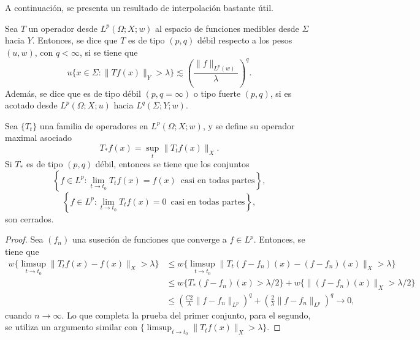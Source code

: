 A continuación, se presenta un resultado de interpolación bastante útil. 
\begin{definition}
	Sea $T$ un operador desde $L^p(\Omega;X;w)$ al espacio de funciones medibles desde $\Sigma$ hacia $Y$. Entonces, se dice que $T$ es de tipo $(p,q)$ débil respecto a los pesos $(u,w)$, con $q<\infty$, si se tiene que 
	\begin{equation*}
		u\{x\in\Sigma:\|Tf(x)\|_Y>\lambda\}\lesssim \left(\frac{\|f\|_{L^p(w)}}{\lambda}\right)^q.
	\end{equation*}
	Además, se dice que es de tipo débil $(p, q=\infty)$ o tipo fuerte $(p, q)$, si es acotado desde $L^p(\Omega;X;u)$ hacia $L^q(\Sigma;Y;w)$.
\end{definition}
\begin{theorem}\label{theo:weak-closed}
	Sea $\{T_t\}$ una familia de operadores en $L^p(\Omega;X;w)$, y se define su operador maximal asociado 
	\begin{equation*}
		T_*f(x) = \sup_t \|T_tf(x)\|_X.
	\end{equation*}
	Si $T_*$ es de tipo $(p,q)$ débil, entonces se tiene que los conjuntos
	\begin{equation*}
		\left\{f\in L^p: \lim_{t\to t_0} T_tf(x) = f(x)\, \text{ casi en todas partes} \right\},
	\end{equation*}
	\begin{equation*}
		\left\{f\in L^p: \lim_{t\to t_0} T_tf(x) = 0\, \text{ casi en todas partes} \right\},
	\end{equation*}
	son cerrados.
\end{theorem}
\begin{proof}
	Sea $(f_n)$ una suseción de funciones que converge a $f\in L^p$. Entonces, se tiene que 
	\begin{align*}
		w\{\limsup_{t\to t_0} \|T_tf(x) - f(x)\|_X > \lambda \}  &\leq w\{\limsup_{t\to t_0} \|T_t(f-f_n)(x) - (f-f_n)(x)\|_X >\lambda \}\\
		& \leq w\{T_*(f-f_n)(x)>\lambda/2 \} +  w\{\|(f-f_n)(x)\|_X >\lambda/2 \}\\
		& \leq \left(\frac{C2}{\lambda}\|f-f_n\|_{L^p}\right)^q + \left(\frac{2}{\lambda}\|f-f_n\|_{L^p}\right)^q \to 0,
	\end{align*}
	cuando $n\to\infty$. Lo que completa la prueba del primer conjunto, para el segundo, se utiliza un argumento similar con $\{\limsup_{t\to t_0}\|T_tf(x)\|_X>\lambda\}$.
\end{proof}
